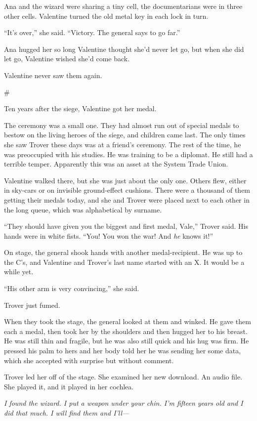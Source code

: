 Ana and the wizard were sharing a tiny cell, the documentarians
were in three other cells. Valentine turned the old metal key in
each lock in turn.

“It’s over,” she said. “Victory. The general says to go far.”

Ana hugged her so long Valentine thought she’d never let go, but
when she did let go, Valentine wished she’d come back.

Valentine never saw them again.

\#

Ten years after the siege, Valentine got her medal.

The ceremony was a small one. They had almost run out of special
medals to bestow on the living heroes of the siege, and children
came last. The only times she saw Trover these days was at a
friend’s ceremony. The rest of the time, he was preoccupied with
his studies. He was training to be a diplomat. He still had a
terrible temper. Apparently this was an asset at the System Trade
Union.

Valentine walked there, but she was just about the only one. Others
flew, either in sky-cars or on invisible ground-effect cushions.
There were a thousand of them getting their medals today, and she
and Trover were placed next to each other in the long queue, which
was alphabetical by surname.

“They should have given you the biggest and first medal, Vale,”
Trover said. His hands were in white fists. “You! You won the war!
And \emph{he} knows it!”

On stage, the general shook hands with another medal-recipient. He
was up to the C’s, and Valentine and Trover’s last name started
with an X. It would be a while yet.

“His other arm is very convincing,” she said.

Trover just fumed.

When they took the stage, the general looked at them and winked. He
gave them each a medal, then took her by the shoulders and then
hugged her to his breast. He was still thin and fragile, but he was
also still quick and his hug was firm. He pressed his palm to hers
and her body told her he was sending her some data, which she
accepted with surprise but without comment.

Trover led her off of the stage. She examined her new download. An
audio file. She played it, and it played in her cochlea.

\emph{I found the wizard. I put a weapon under your chin. I’m fifteen years old and I did that much. I will find them and I’ll—}

